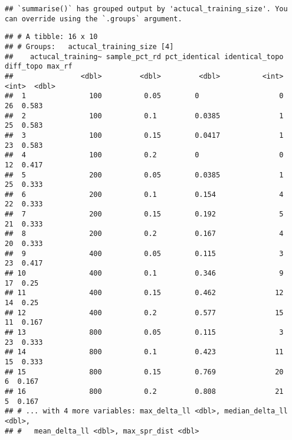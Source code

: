 \documentclass[
]{article}
\newenvironment{Shaded}{\begin{snugshade}}{\end{snugshade}}
\newcommand{\DataTypeTok}[1]{\textcolor[rgb]{0.13,0.29,0.53}{#1}}
\newcommand{\DecValTok}[1]{\textcolor[rgb]{0.00,0.00,0.81}{#1}}
\newcommand{\KeywordTok}[1]{\textcolor[rgb]{0.13,0.29,0.53}{\textbf{#1}}}
\newcommand{\NormalTok}[1]{#1}
\newcommand{\OperatorTok}[1]{\textcolor[rgb]{0.81,0.36,0.00}{\textbf{#1}}}
\newcommand{\StringTok}[1]{\textcolor[rgb]{0.31,0.60,0.02}{#1}}
\begin{document}
\begin{verbatim}
## `summarise()` has grouped output by 'actucal_training_size'. You can override using the `.groups` argument.
\end{verbatim}

\begin{verbatim}
## # A tibble: 16 x 10
## # Groups:   actucal_training_size [4]
##    actucal_training~ sample_pct_rd pct_identical identical_topo diff_topo max_rf
##                <dbl>         <dbl>         <dbl>          <int>     <int>  <dbl>
##  1               100          0.05        0                   0        26  0.583
##  2               100          0.1         0.0385              1        25  0.583
##  3               100          0.15        0.0417              1        23  0.583
##  4               100          0.2         0                   0        12  0.417
##  5               200          0.05        0.0385              1        25  0.333
##  6               200          0.1         0.154               4        22  0.333
##  7               200          0.15        0.192               5        21  0.333
##  8               200          0.2         0.167               4        20  0.333
##  9               400          0.05        0.115               3        23  0.417
## 10               400          0.1         0.346               9        17  0.25 
## 11               400          0.15        0.462              12        14  0.25 
## 12               400          0.2         0.577              15        11  0.167
## 13               800          0.05        0.115               3        23  0.333
## 14               800          0.1         0.423              11        15  0.333
## 15               800          0.15        0.769              20         6  0.167
## 16               800          0.2         0.808              21         5  0.167
## # ... with 4 more variables: max_delta_ll <dbl>, median_delta_ll <dbl>,
## #   mean_delta_ll <dbl>, max_spr_dist <dbl>
\end{verbatim}

\begin{Shaded}
\end{Shaded}
\end{document}
